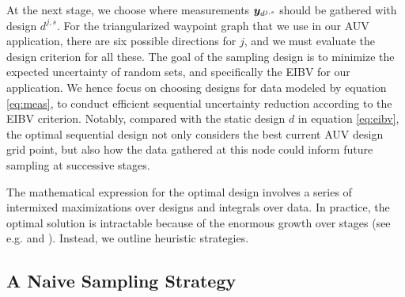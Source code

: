 \documentclass[aoas]{imsart}
\begin{document}
At the next stage, we choose where measurements ${\boldsymbol y}_{d^{j,s}}$ should be gathered with
design $d^{j,s}$. For the triangularized waypoint graph that we use in our AUV application, there are six possible directions for $j$, and we must evaluate the design criterion for all these. 
The goal of the sampling design is to minimize the expected uncertainty of random sets, and specifically the EIBV for our application. We hence focus on choosing designs for data modeled by equation \eqref{eq:meas}, to conduct efficient sequential uncertainty reduction according to the EIBV criterion.
Notably, compared with the static design $d$ in equation \eqref{eq:eibv}, the optimal sequential design not only considers the best current AUV
design grid point, but also how the data gathered at this node could inform future sampling at successive stages. 



The mathematical expression for the optimal design involves a
series of intermixed maximizations over designs and integrals over
data. In practice, the optimal solution is intractable because of
the enormous growth over stages (see
e.g. \cite{sucar2015probabilistic} and \cite{powell2016perspectives}).
Instead, we outline heuristic strategies. 


 
\subsection{A Naive Sampling Strategy}
\label{naive}
\end{document}

